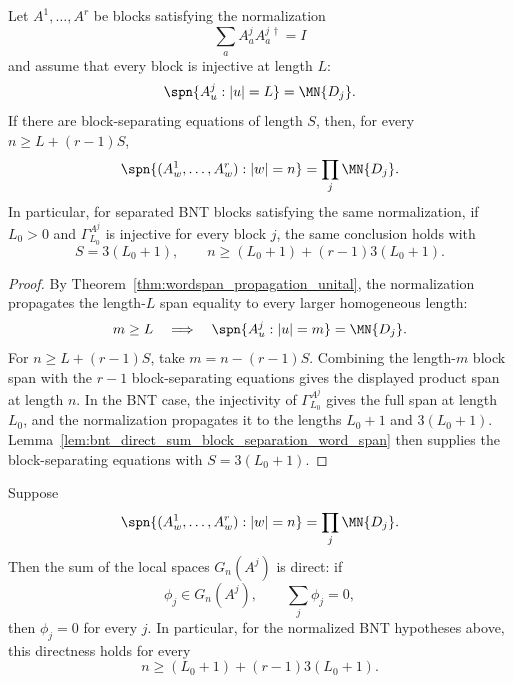\begin{lemma}
    \label{lem:unital_block_separating_product_span}
    \leanok
    Let $A^1,\ldots,A^r$ be blocks satisfying the normalization
    \[
        \sum_a A^j_aA^{j\,\dagger}_a=I
    \]
    and assume that every block is injective at length $L$:
    \[
        \spn\{A^j_u:|u|=L\}=\MN{D_j}.
    \]
    If there are block-separating equations of length $S$, then, for every
    $n\ge L+(r-1)S$,
    \[
        \spn\{(A^1_w,\ldots,A^r_w):|w|=n\}
        =
        \prod_j \MN{D_j}.
    \]
    In particular, for separated BNT blocks satisfying the same normalization,
    if $L_0>0$ and $\Gamma_{L_0}^{A^j}$ is injective for every block $j$,
    the same conclusion holds with
    \[
        S=3(L_0+1),
        \qquad
        n\ge (L_0+1)+(r-1)3(L_0+1).
    \]
\end{lemma}

\begin{proof}
    \leanok
    By Theorem~\ref{thm:wordspan_propagation_unital}, the normalization
    propagates the length-$L$ span equality to every larger homogeneous length:
    \[
        m\ge L
        \quad\Longrightarrow\quad
        \spn\{A^j_u:|u|=m\}=\MN{D_j}.
    \]
    For $n\ge L+(r-1)S$, take $m=n-(r-1)S$. Combining the length-$m$
    block span with the $r-1$ block-separating equations gives the displayed
    product span at length $n$. In the BNT case, the injectivity of
    $\Gamma_{L_0}^{A^j}$ gives the full span at length $L_0$, and the
    normalization propagates it to the lengths $L_0+1$ and $3(L_0+1)$.
    Lemma~\ref{lem:bnt_direct_sum_block_separation_word_span} then supplies the
    block-separating equations with $S=3(L_0+1)$.
\end{proof}

\begin{lemma}
    \label{lem:product_span_block_image_direct_sum}
    \leanok
    Suppose
    \[
        \spn\{(A^1_w,\ldots,A^r_w):|w|=n\}
        =
        \prod_j\MN{D_j}.
    \]
    Then the sum of the local spaces $G_n(A^j)$ is direct: if
    \[
        \phi_j\in G_n(A^j),
        \qquad
        \sum_j\phi_j=0,
    \]
    then $\phi_j=0$ for every $j$.  In particular, for the normalized BNT
    hypotheses above, this directness holds for every
    \[
        n\ge (L_0+1)+(r-1)3(L_0+1).
    \]
\end{lemma}

